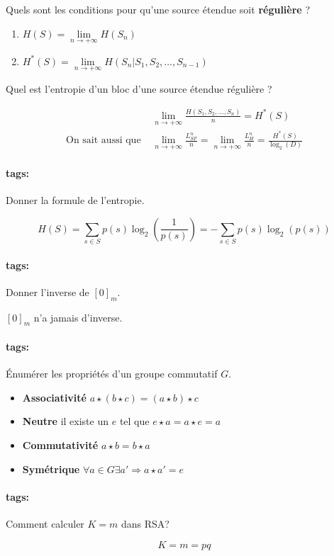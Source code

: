 \documentclass[12pt]{article}
\newcommand*{\xfield}[1]{\begin{mdframed}\centering #1\end{mdframed}\bigskip}
\newenvironment{note}{}{}
\newcommand*{\tags}[1]{\paragraph{tags: }#1}
\begin{document}
\begin{note}
	\xfield{Quels sont les conditions pour qu'une source étendue soit \textbf{régulière} ?}
	\xfield{\begin{enumerate}
	\item $H(S) = \lim\limits_{n \to +\infty} H(S_n)$
	\item $H^*(S) = \lim\limits_{n \to +\infty} H(S_n|S_1,S_2,\hdots,S_{n-1})$
	\end{enumerate}}
\end{note}

\begin{note}
	\xfield{Quel est l'entropie d'un bloc d'une source étendue régulière ?}
	\xfield{\begin{align*}
	&\lim\limits_{n \to +\infty} \frac{H(S_1,S_2,\hdots,S_n)}{n} = H^*(S)\\
	\text{On sait aussi que } &\lim\limits_{n \to +\infty} \frac{L^n_{SF}}{n}=\lim\limits_{n \to +\infty}\frac{L^n_H}{n}=\frac{H^*(S)}{\log_2(D)}
	\end{align*}}
\end{note}

\begin{note}
	\tags{}
	\xfield{
		Donner la formule de l'entropie.	
	}
	\xfield{
		$$H(S) = \sum\limits_{s \in S} p(s)\log_2\left(\frac{1}{p(s)}\right) = -\sum\limits_{s \in S} p(s)\log_2(p(s))$$	
	}
\end{note}

\begin{note}
	\tags{}
	\xfield{
		Donner l'inverse de $[0]_m$.
	}
	\xfield{
		$[0]_m$ n'a jamais d'inverse.
	}
\end{note}

\begin{note}
	\tags{}
	\xfield{
		Énumérer les propriétés d'un groupe commutatif $G$.
	}
	\xfield{
		\begin{itemize}
		\item \textbf{Associativité} $a \star (b \star c) = (a \star b) \star c$
		\item \textbf{Neutre} il existe un $e$ tel que $e \star a = a \star e = a$
		\item \textbf{Commutativité} $a \star b = b \star a$
		\item \textbf{Symétrique} $\forall a \in G \exists a' \Rightarrow a \star a' = e$
		\end{itemize}
	}
\end{note}

\begin{note}
	\tags{}
	\xfield{
		Comment calculer $K = m$ dans RSA?
	}
	\xfield{
		$$K = m = pq$$
	}
\end{note}
\end{document}
